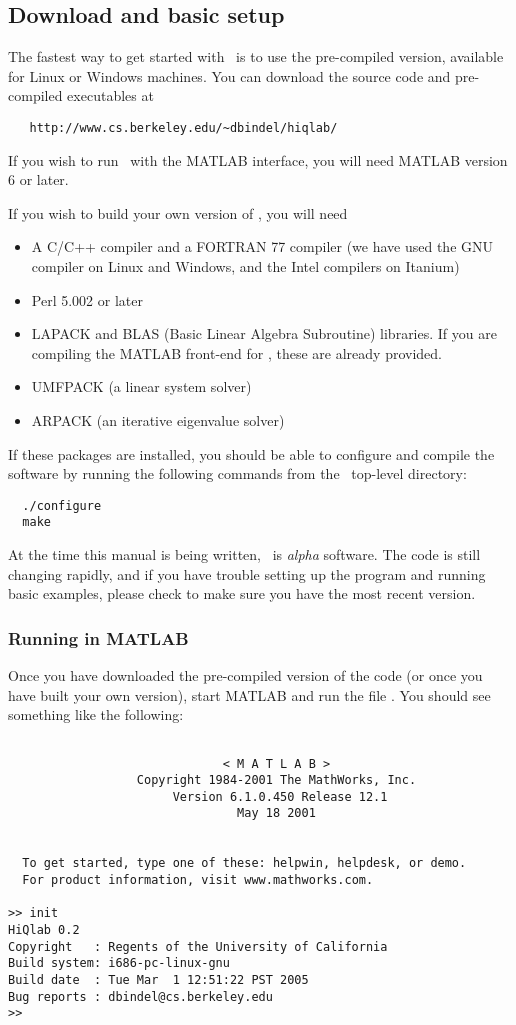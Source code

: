 \subsection{Download and basic setup}

The fastest way to get started with \hiq\ is to use the pre-compiled
version, available for Linux or Windows machines.  You can download
the source code and pre-compiled executables at
\begin{verbatim}
   http://www.cs.berkeley.edu/~dbindel/hiqlab/
\end{verbatim}
If you wish to run \hiq\ with the MATLAB interface, you will need
MATLAB version 6 or later.

If you wish to build your own version of \hiq, you will need
\begin{itemize}
  \item A C/C++ compiler and a FORTRAN 77 compiler (we have used the
    GNU compiler on Linux and Windows, and the Intel compilers on
    Itanium)
  \item Perl 5.002 or later
  \item LAPACK and BLAS (Basic Linear Algebra Subroutine) libraries.
    If you are compiling the MATLAB front-end for \hiq, these are
    already provided.
  \item UMFPACK (a linear system solver)
  \item ARPACK (an iterative eigenvalue solver)
\end{itemize}
If these packages are installed, you should be able to configure and
compile the software by running the following commands from the \hiq\
top-level directory:
\begin{verbatim}
  ./configure
  make
\end{verbatim}

At the time this manual is being written, \hiq\ is \emph{alpha}
software.  The code is still changing rapidly, and if you have trouble
setting up the program and running basic examples, please check to
make sure you have the most recent version.


\subsubsection{Running in MATLAB}

Once you have downloaded the pre-compiled version of the code (or once
you have built your own version), start MATLAB and run the file
.  You should see something like the following:
\begin{verbatim}
 
                              < M A T L A B >
                  Copyright 1984-2001 The MathWorks, Inc.
                       Version 6.1.0.450 Release 12.1
                                May 18 2001
 
  
  To get started, type one of these: helpwin, helpdesk, or demo.
  For product information, visit www.mathworks.com.
  
>> init
HiQlab 0.2
Copyright   : Regents of the University of California
Build system: i686-pc-linux-gnu
Build date  : Tue Mar  1 12:51:22 PST 2005
Bug reports : dbindel@cs.berkeley.edu
>>
\end{verbatim}

